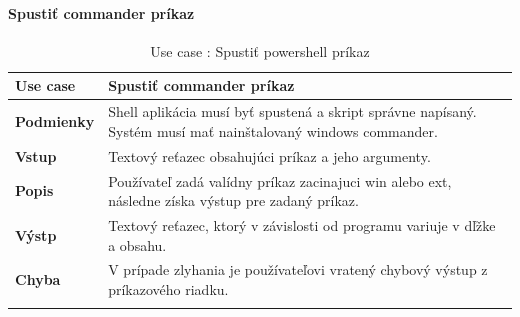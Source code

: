 \paragraph{Spustiť commander príkaz}
\begin{center}
	\begin{longtable}{|p{2.5cm}|p{14cm}|}

			\hline
			\textbf{Use case} & Spustiť commander príkaz \\ 
			\hline
			\textbf{Podmienky} & Shell aplikácia musí byť spustená a skript správne napísaný. Systém musí mať nainštalovaný windows commander.\\ 
			\hline
			\textbf{Vstup} & Textový reťazec obsahujúci príkaz a jeho argumenty.\\
			\hline
			\textbf{Popis} & Používateľ zadá valídny príkaz zacinajuci win alebo ext, následne získa výstup pre zadaný príkaz. \\ 
			\hline
			\textbf{Výstp} &Textový reťazec, ktorý v závislosti od programu variuje v dľžke a obsahu. \\
			\hline
			\textbf{Chyba} & V prípade zlyhania je používateľovi vratený chybový výstup z príkazového riadku.\\
			\hline
	\caption{Use case : Spustiť powershell príkaz}
	\label{table:1}

	\end{longtable}
\end{center}
